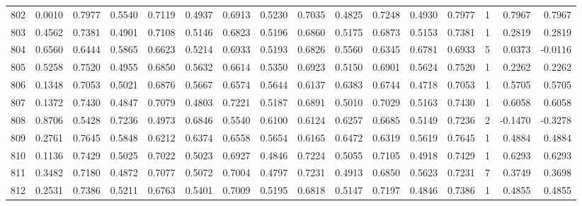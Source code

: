 \begin{tabular}{lrrrrrrrrrrrrrrr}
802 &      0.0010 &  0.7977 &  0.5540 &  0.7119 &  0.4937 &  0.6913 &  0.5230 &  0.7035 &  0.4825 &  0.7248 &   0.4930 &     0.7977 &      1 &                    0.7967 &                     0.7967 \\
803 &      0.4562 &  0.7381 &  0.4901 &  0.7108 &  0.5146 &  0.6823 &  0.5196 &  0.6860 &  0.5175 &  0.6873 &   0.5153 &     0.7381 &      1 &                    0.2819 &                     0.2819 \\
804 &      0.6560 &  0.6444 &  0.5865 &  0.6623 &  0.5214 &  0.6933 &  0.5193 &  0.6826 &  0.5560 &  0.6345 &   0.6781 &     0.6933 &      5 &                    0.0373 &                    -0.0116 \\
805 &      0.5258 &  0.7520 &  0.4955 &  0.6850 &  0.5632 &  0.6614 &  0.5350 &  0.6923 &  0.5150 &  0.6901 &   0.5624 &     0.7520 &      1 &                    0.2262 &                     0.2262 \\
806 &      0.1348 &  0.7053 &  0.5021 &  0.6876 &  0.5667 &  0.6574 &  0.5644 &  0.6137 &  0.6383 &  0.6744 &   0.4718 &     0.7053 &      1 &                    0.5705 &                     0.5705 \\
807 &      0.1372 &  0.7430 &  0.4847 &  0.7079 &  0.4803 &  0.7221 &  0.5187 &  0.6891 &  0.5010 &  0.7029 &   0.5163 &     0.7430 &      1 &                    0.6058 &                     0.6058 \\
808 &      0.8706 &  0.5428 &  0.7236 &  0.4973 &  0.6846 &  0.5540 &  0.6100 &  0.6124 &  0.6257 &  0.6685 &   0.5149 &     0.7236 &      2 &                   -0.1470 &                    -0.3278 \\
809 &      0.2761 &  0.7645 &  0.5848 &  0.6212 &  0.6374 &  0.6558 &  0.5654 &  0.6165 &  0.6472 &  0.6319 &   0.5619 &     0.7645 &      1 &                    0.4884 &                     0.4884 \\
810 &      0.1136 &  0.7429 &  0.5025 &  0.7022 &  0.5023 &  0.6927 &  0.4846 &  0.7224 &  0.5055 &  0.7105 &   0.4918 &     0.7429 &      1 &                    0.6293 &                     0.6293 \\
811 &      0.3482 &  0.7180 &  0.4872 &  0.7077 &  0.5072 &  0.7004 &  0.4797 &  0.7231 &  0.4913 &  0.6850 &   0.5623 &     0.7231 &      7 &                    0.3749 &                     0.3698 \\
812 &      0.2531 &  0.7386 &  0.5211 &  0.6763 &  0.5401 &  0.7009 &  0.5195 &  0.6818 &  0.5147 &  0.7197 &   0.4846 &     0.7386 &      1 &                    0.4855 &                     0.4855 \\

\end{tabular}
